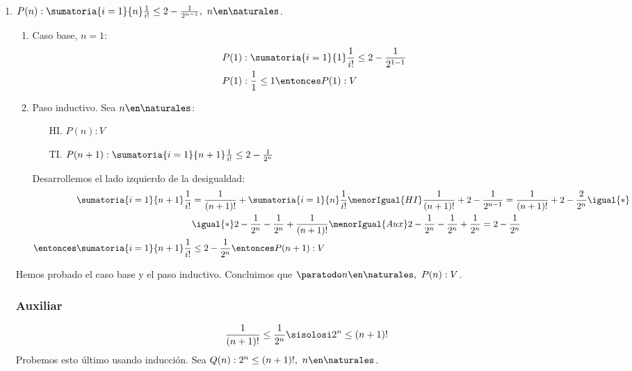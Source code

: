 \begin{enumerate}[label=\roman*)]
  \item $P(n): \sumatoria{i=1}{n} \frac{1}{i!} \leq 2 - \frac{1}{2^{n-1}}, \ n \en \naturales$.
        \begin{enumerate}[label=\arabic*)]
          \item Caso base, $n = 1$:
                \begin{align*}
                  P(1) & : \sumatoria{i=1}{1} \frac{1}{i!} \leq 2 - \frac{1}{2^{1-1}} \\
                  P(1) & : \frac{1}{1} \leq 1 \entonces P(1):V
                \end{align*}
          \item Paso inductivo. Sea $n \en \naturales$:
                \begin{enumerate}
                  \item[HI.] $P(n): V$
                  \item[TI.] $P(n+1):  \sumatoria{i=1}{n+1} \frac{1}{i!} \leq 2 - \frac{1}{2^{n}}$
                \end{enumerate}

                Desarrollemos el lado izquierdo de la desigualdad:
                \begin{align*}
                  \sumatoria{i=1}{n+1} \frac{1}{i!}           & = \frac{1}{(n+1)!} + \sumatoria{i=1}{n} \frac{1}{i!} \menorIgual{HI}
                  \frac{1}{(n+1)!} + 2 - \frac{1}{2^{n-1}} = \frac{1}{(n+1)!} + 2 - \frac{2}{2^{n}} \igual{*}                                        \\
                                                              & \igual{*}  2 - \frac{1}{2^{n}} - \frac{1}{2^{n}} + \frac{1}{(n+1)!} \menorIgual{Aux}
                  2 - \frac{1}{2^{n}} - \frac{1}{2^{n}} + \frac{1}{2^{n}} = 2 - \frac{1}{2^{n}}                                                      \\
                  \entonces \sumatoria{i=1}{n+1} \frac{1}{i!} & \leq 2 - \frac{1}{2^{n}} \entonces P(n+1):V
                \end{align*}
        \end{enumerate}

        Hemos probado el caso base y el paso inductivo. Concluimos que $\paratodo n \en \naturales, \ P(n): V$.

        \subsubsection*{Auxiliar}
        \begin{align*}
          \frac{1}{(n+1)!} \leq \frac{1}{2^n} \sisolosi 2^n \leq (n+1)!
        \end{align*}
        Probemos esto último usando inducción. Sea $Q(n): 2^n \leq (n+1)!, \ n \en \naturales$.


\end{enumerate}

